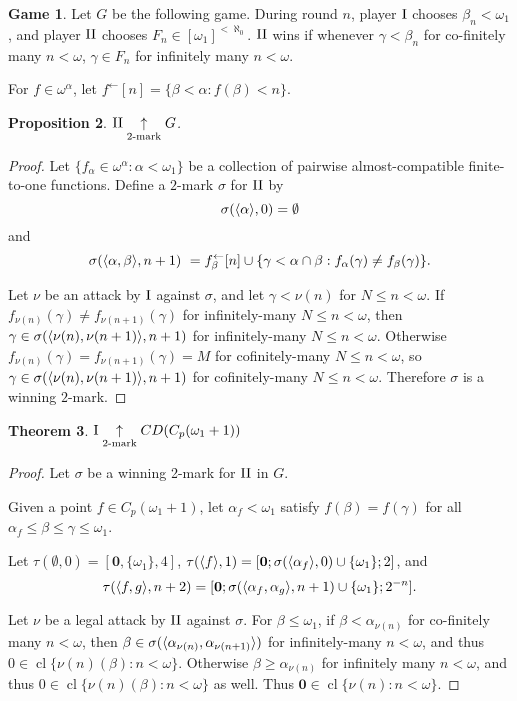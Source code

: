 \documentclass{amsart}
\theoremstyle{plain}
\newtheorem{theorem}{Theorem}
\newtheorem{proposition}[theorem]{Proposition}
\theoremstyle{definition}
\newtheorem{game}[theorem]{Game}
\theoremstyle{remark}
\theoremstyle{plain}
\theoremstyle{definition}
\theoremstyle{remark}
\begin{document}
\begin{game}
  Let \(G\) be the following game. During round \(n\), player \(\mathrm{I}\)
  chooses \(\beta_n<\omega_1\), and player \(\mathrm{II}\) chooses
  \(F_n\in[\omega_1]^{<\aleph_0}\). \(\mathrm{II}\) wins if
  whenever \(\gamma<\beta_n\) for co-finitely many \(n<\omega\),
  \(\gamma\in F_n\) for infinitely many \(n<\omega\).
\end{game}

For \(f\in\omega^\alpha\), let 
\(f^{\leftarrow}[n]=\{\beta<\alpha:f(\beta)<n\}\).

\begin{proposition}
  \(\mathrm{II} \underset{2\text{-mark}}{\uparrow} G\).
\end{proposition}
\begin{proof}
  Let \(\{f_\alpha\in\omega^\alpha:\alpha<\omega_1\}\) be a collection
  of pairwise almost-compatible finite-to-one functions.
  Define a \(2\)-mark \(\sigma\) for \(\mathrm{II}\) by
  \[\sigma(\langle\alpha\rangle,0)=\emptyset\] and
  \[
    \sigma(\langle\alpha,\beta\rangle,n+1)\
      =
    f_\beta^\leftarrow[n]
      \cup
    \{\gamma<\alpha\cap\beta:f_\alpha(\gamma)\not=f_\beta(\gamma)\}
  .\]
  
  Let \(\nu\) be an attack by \(\mathrm{I}\) against \(\sigma\), and let
  \(\gamma<\nu(n)\) for \(N\leq n<\omega\).
  If \(f_{\nu(n)}(\gamma)\not=f_{\nu(n+1)}(\gamma)\) for infinitely-many
  \(N\leq n<\omega\), then \(\gamma\in\sigma(\langle\nu(n),\nu(n+1)\rangle,n+1)\)
  for infinitely-many \(N\leq n<\omega\).
  Otherwise \(f_{\nu(n)}(\gamma)=f_{\nu(n+1)}(\gamma)=M\) for cofinitely-many
  \(N\leq n<\omega\), so \(\gamma\in\sigma(\langle\nu(n),\nu(n+1)\rangle,n+1)\)
  for cofinitely-many \(N\leq n<\omega\). Therefore \(\sigma\) is a winning \(2\)-mark.
\end{proof}

\begin{theorem}
  \(\mathrm{I}\underset{2\text{-mark}}{\uparrow}CD(C_p(\omega_1+1))\)
\end{theorem}
\begin{proof}
  Let \(\sigma\) be a winning 2-mark for \(\mathrm{II}\) in \(G\).

  Given a point \(f\in C_p(\omega_1+1)\),
  let \(\alpha_f<\omega_1\) satisfy \(f(\beta)=f(\gamma)\) for all
  \(\alpha_f\leq\beta\leq\gamma\leq\omega_1\).

  Let \(\tau(\emptyset,0)=[\mathbf{0},\{\omega_1\},4]\),
  \(\tau(\langle f\rangle,1)=[\mathbf{0};\sigma(\langle\alpha_f\rangle,0)\cup\{\omega_1\};2]\), and
  \[\tau(\langle f,g\rangle,n+2)=[\mathbf{0};\sigma(\langle\alpha_f,\alpha_g\rangle,n+1)\cup\{\omega_1\};2^{-n}].\]

  Let \(\nu\) be a legal attack by \(\mathrm{II}\) against \(\sigma\).
  For \(\beta\leq\omega_1\), if \(\beta<\alpha_{\nu(n)}\)
  for co-finitely many \(n<\omega\), then
  \(\beta\in\sigma(\langle\alpha_{\nu(n)},\alpha_{\nu(n+1)}\rangle)\) for
  infinitely-many \(n<\omega\), and thus \(0\in\operatorname{cl}\{\nu(n)(\beta):n<\omega\}\).
  Otherwise \(\beta\geq\alpha_{\nu(n)}\) for infinitely many \(n<\omega\),
  and thus \(0\in\operatorname{cl}\{\nu(n)(\beta):n<\omega\}\) as well.
  Thus \(\mathbf{0}\in\operatorname{cl}\{\nu(n):n<\omega\}\).
\end{proof}
\end{document}
